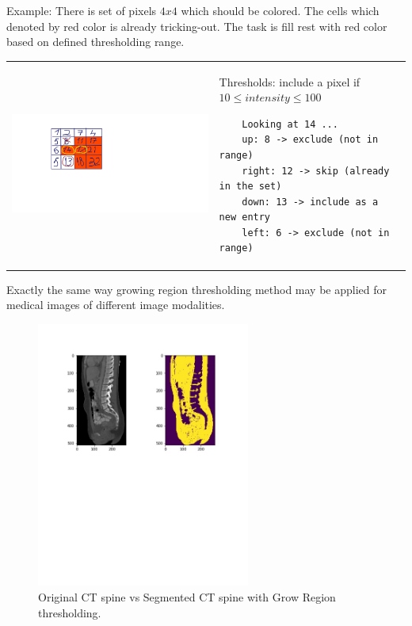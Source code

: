 Example: There is set of pixels $4x4$ which should be colored. The cells which denoted by red color is already tricking-out. The task is fill rest with red color based on defined thresholding range.       

\begin{tabular}{C{7cm}  L{7cm}}
    \includegraphics[width=12cm]{images/grow_region_3.png} & Thresholds: include a pixel if $10 \leq intensity \leq 100$ \newline 
    \begin{lstlisting}
    Looking at 14 ...
    up: 8 -> exclude (not in range)
    right: 12 -> skip (already in the set)
    down: 13 -> include as a new entry
    left: 6 -> exclude (not in range)
    \end{lstlisting}
\end{tabular}

Exactly the same way growing region thresholding method may be applied for medical images of different image modalities.
\begin{figure}[h]
    \centering \includegraphics[width=7cm]{images/ct-spine-grow-region-segmented.jpg}
    \vspace*{-30mm} \caption {Original CT spine vs Segmented CT spine with Grow Region thresholding.}
\end{figure}    


